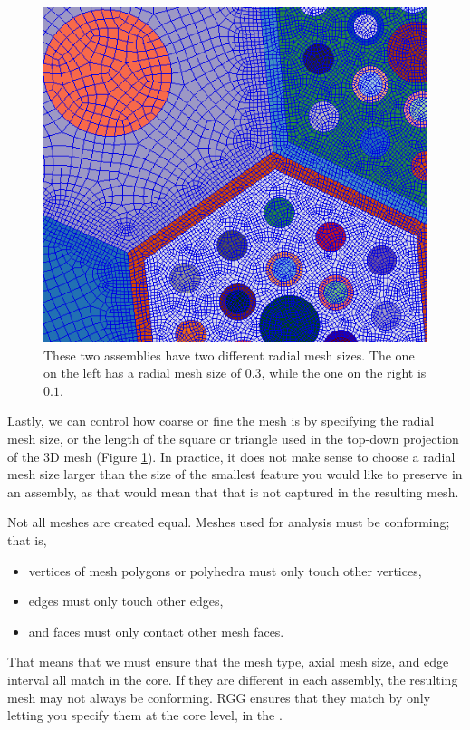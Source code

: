 \begin{figure}
	\begin{center}
		\includegraphics[width=0.8\linewidth]{Images/radial-mesh-size.png}
		\caption{These two assemblies have two different radial mesh sizes.  The one on the left has a radial mesh size of $0.3$, while the one on the right is $0.1$.}
		\label{fig:RadialMesh}
	\end{center}
	\vspace{-20pt}
\end{figure}

Lastly, we can control how coarse or fine the mesh is by specifying the radial mesh size, or the length of the square or triangle used in the top-down projection of the 3D mesh (Figure \ref{fig:RadialMesh}).  In practice, it does not make sense to choose a radial mesh size larger than the size of the smallest feature you would like to preserve in an assembly, as that would mean that that is not captured in the resulting mesh.

Not all meshes are created equal.  Meshes used for analysis must be conforming; that is,

\begin{itemize}
	\item{vertices of mesh polygons or polyhedra must only touch other vertices,}
	\item{edges must only touch other edges,}
	\item{and faces must only contact other mesh faces.}
\end{itemize}

That means that we must ensure that the mesh type, axial mesh size, and edge interval all match in the core.  If they are different in each assembly, the resulting mesh may not always be conforming.  RGG ensures that they match by only letting you specify them at the core level, in the .

